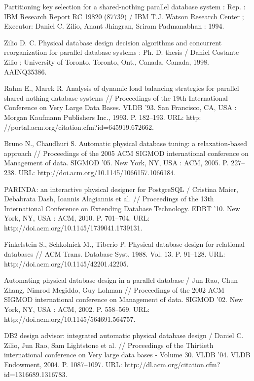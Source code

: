 \documentclass[unicode]{beamer}
\begin{document}
\begin{frame}[allowframebreaks]
{\begin{thebibliography}{99}
 Partitioning key selection for a shared-nothing parallel database system : Rep. : IBM Research Report RC 19820 (87739) / IBM T.J. Watson Research Center ; Executor: Daniel C. Zilio, Anant Jhingran, Sriram Padmanabhan : 1994.

 Zilio D. C. Physical database design decision algorithms and concurrent reorganization for parallel database systems : Ph. D. thesis / Daniel Costante Zilio ; University of Toronto. Toronto, Ont., Canada, Canada, 1998. AAINQ35386.

 Rahm E., Marek R. Analysis of dynamic load balancing strategies for parallel shared nothing database systems // Proceedings of the 19th International Conference on Very Large Data Bases. VLDB ’93. San Francisco, CA, USA : Morgan Kaufmann Publishers Inc., 1993. P. 182--193. URL: http: //portal.acm.org/citation.cfm?id=645919.672662.

 Bruno N., Chaudhuri S. Automatic physical database tuning: a relaxation-based approach // Proceedings of the 2005 ACM SIGMOD international conference on Management of data. SIGMOD ’05. New York, NY, USA : ACM, 2005. P. 227--238. URL: http://doi.acm.org/10.1145/1066157.1066184.

 PARINDA: an interactive physical designer for PostgreSQL / Cristina Maier, Debabrata Dash, Ioannis Alagiannis et al. // Proceedings of the 13th International Conference on Extending Database Technology. EDBT ’10. New York, NY, USA : ACM, 2010. P. 701--704. URL: http://doi.acm.org/10.1145/1739041.1739131.

 Finkelstein S., Schkolnick M., Tiberio P. Physical database design for relational databases // ACM Trans. Database Syst. 1988. Vol. 13. P. 91--128. URL: http://doi.acm.org/10.1145/42201.42205.

 Automating physical database design in a parallel database / Jun Rao, Chun Zhang, Nimrod Megiddo, Guy Lohman // Proceedings of the 2002 ACM SIGMOD international conference on Management of data. SIGMOD ’02. New York, NY, USA : ACM, 2002. P. 558–569. URL: http://doi.acm.org/10.1145/564691.564757.

 {DB2} design advisor: integrated automatic physical database design / Daniel C. Zilio, Jun Rao, Sam Lightstone et al. // Proceedings of the Thirtieth international conference on Very large data bases - Volume 30. VLDB ’04. VLDB Endowment, 2004. P. 1087--1097. URL: http://dl.acm.org/citation.cfm?id=1316689.1316783.


\end{thebibliography}}
\end{frame}
\end{document}

